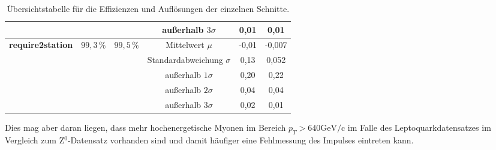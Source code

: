 \begin{sidewaystable}[htbp]
\begin{tabular}{c|c|c|c|c|c}
\multicolumn{ 1}{l|}{} & \multicolumn{ 1}{l|}{} & \multicolumn{ 1}{l|}{} & außerhalb $3\sigma$ & 0,01 & 0,01 \\ \hline
\multicolumn{ 1}{l|}{\textbf{require2station}} & \multicolumn{ 1}{l|}{$99,3\,\%$} & \multicolumn{ 1}{l|}{$99,5\,\%$} & Mittelwert $\mu$ & -0,01 & -0,007 \\ \cline{ 4- 6}
\multicolumn{ 1}{l|}{} & \multicolumn{ 1}{l|}{} & \multicolumn{ 1}{l|}{} & Standardabweichung $\sigma$ & 0,13 & 0,052 \\ \cline{ 4- 6}
\multicolumn{ 1}{l|}{} & \multicolumn{ 1}{l|}{} & \multicolumn{ 1}{l|}{} & außerhalb $1\sigma$ & 0,20 & 0,22 \\ \cline{ 4- 6}
\multicolumn{ 1}{l|}{} & \multicolumn{ 1}{l|}{} & \multicolumn{ 1}{l|}{} & außerhalb $2\sigma$ & 0,04 & 0,04 \\ \cline{ 4- 6}
\multicolumn{ 1}{l|}{} & \multicolumn{ 1}{l|}{} & \multicolumn{ 1}{l|}{} & außerhalb $3\sigma$ & 0,02 & 0,01 \\ \hline
\hline
\end{tabular}
\caption{Übersichtstabelle für die Effizienzen und Auflösungen der einzelnen Schnitte.}
\label{EffUNDAufl}
\end{sidewaystable}
Dies mag aber daran liegen, dass mehr hochenergetische Myonen im Bereich $p_T>640\text{GeV}/\text{c}$ im Falle des Leptoquarkdatensatzes im Vergleich zum Z$^0$-Datensatz vorhanden sind und damit häufiger eine Fehlmessung des Impulses eintreten kann.

